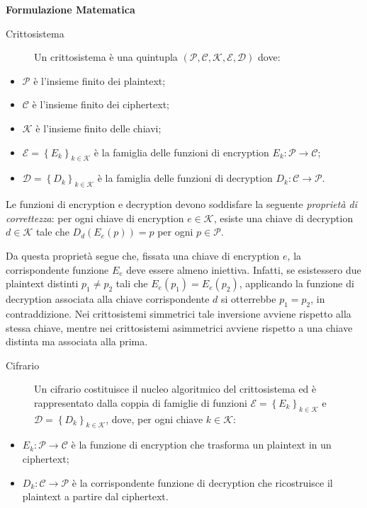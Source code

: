 \newpage

\begin{gray-quote}
  \textbf{Formulazione Matematica}

  \begin{description}
    \item[Crittosistema] Un crittosistema è una quintupla $(\mathcal P, \mathcal C, \mathcal K, \mathcal E, \mathcal
      D)$ dove:
  \end{description}

  \begin{itemize}
    \tightlist
    \item $\mathcal P$ è l'insieme finito dei plaintext;
    \item $\mathcal C$ è l'insieme finito dei ciphertext;
    \item $\mathcal K$ è l'insieme finito delle chiavi;
    \item $\mathcal E = \left\{ E_k \right\}_{k \in \mathcal K}$ è la famiglia delle funzioni di encryption $E_k :
      \mathcal P \to \mathcal C$;
    \item $\mathcal D = \left\{ D_k \right\}_{k \in \mathcal K}$ è la famiglia delle funzioni di decryption $D_k :
      \mathcal C \to \mathcal P$.
  \end{itemize}

  Le funzioni di encryption e decryption devono soddisfare la seguente \emph{proprietà di correttezza}: per ogni chiave
  di encryption $e \in \mathcal K$, esiste una chiave di decryption $d \in \mathcal K$ tale che $D_d(E_e(p)) = p$ per
  ogni $p \in \mathcal P$.

  Da questa proprietà segue che, fissata una chiave di encryption $e$, la corrispondente funzione $E_e$ deve essere
  almeno iniettiva. Infatti, se esistessero due plaintext distinti $p_1 \neq p_2$ tali che $E_e(p_1) = E_e(p_2)$,
  applicando la funzione di decryption associata alla chiave corrispondente $d$ si otterrebbe $p_1 = p_2$, in
  contraddizione. Nei crittosistemi simmetrici tale inversione avviene rispetto alla stessa chiave, mentre nei
  crittosistemi asimmetrici avviene rispetto a una chiave distinta ma associata alla prima.

  \begin{description}
    \item[Cifrario] Un cifrario costituisce il nucleo algoritmico del crittosistema ed è rappresentato dalla coppia di
      famiglie di funzioni $\mathcal E = \left\{ E_k \right\}_{k \in \mathcal K}$ e $\mathcal D = \left\{ D_k
      \right\}_{k \in \mathcal K}$, dove, per ogni chiave $k \in \mathcal K$:
  \end{description}

  \begin{itemize}
    \tightlist
    \item $E_k : \mathcal P \to \mathcal C$ è la funzione di encryption che trasforma un plaintext in un ciphertext;
    \item $D_k : \mathcal C \to \mathcal P$ è la corrispondente funzione di decryption che ricostruisce il plaintext a
      partire dal ciphertext.
  \end{itemize}
\end{gray-quote}

